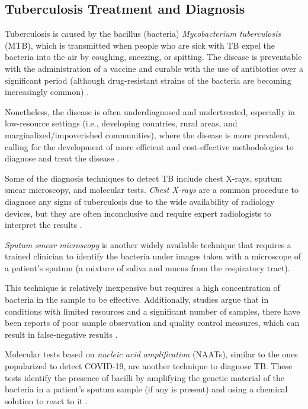 \documentclass[../main.tex]{subfiles}
\begin{document}
    \subsection{Tuberculosis Treatment and Diagnosis} \label{sec:tuberculosis_data}

    Tuberculosis is caused by the bacillus (bacteria) \textit{Mycobacterium tuberculosis} (MTB), which is transmitted when people who are sick with TB expel the bacteria into the air by coughing, sneezing, or spitting. The disease is preventable with the administration of a vaccine and curable with the use of antibiotics over a significant period (although drug-resistant strains of the bacteria are becoming increasingly common) \cite{who_tuberculosis_2023}.
    
    Nonetheless, the disease is often underdiagnosed and undertreated, especially in low-resource settings (i.e., developing countries, rural areas, and marginalized/impoverished communities), where the disease is more prevalent, calling for the development of more efficient and cost-effective methodologies to diagnose and treat the disease \cite{who_global_2022, imi_era4tb_2020,  who_tuberculosis_2023}.

    Some of the diagnosis techniques to detect TB include chest X-rays, sputum smear microscopy, and molecular tests. \textit{Chest X-rays} are a common procedure to diagnose any signs of tuberculosis due to the wide availability of radiology devices, but they are often inconclusive and require expert radiologists to interpret the results \cite{escalante_tuberculosis_2009}.
    
    \textit{Sputum smear microscopy} is another widely available technique that requires a trained clinician to identify the bacteria under images taken with a microscope of a patient's sputum (a mixture of saliva and mucus from the respiratory tract). 
    
    This technique is relatively inexpensive but requires a high concentration of bacteria in the sample to be effective. Additionally, studies argue that in conditions with limited resources and a significant number of samples, there have been reports of poor sample observation and quality control measures, which can result in false-negative results \cite{desikan_sputum_2013}.
    
    Molecular tests based on \textit{nucleic acid amplification} (NAATs), similar to the ones popularized to detect COVID-19, are another technique to diagnose TB. These tests identify the presence of bacilli by amplifying the genetic material of the bacteria in a patient's sputum sample (if any is present) and using a chemical solution to react to it \cite{cdc_tb_2016}. 
    
\end{document}
